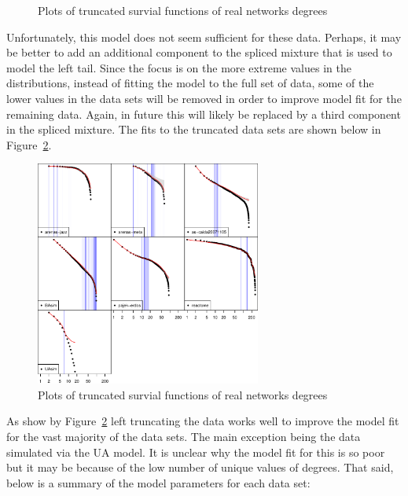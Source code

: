 \documentclass[
  10pt,
  a4paper,
]{scrreprt}
\theoremstyle{plain}
\theoremstyle{plain}
\theoremstyle{definition}
\theoremstyle{plain}
\theoremstyle{remark}
\begin{document}
{\begin{figure}[H]
{}

\caption{\label{fig-fits1}Plots of truncated survial functions of real
networks degrees}

\end{figure}

Unfortunately, this model does not seem sufficient for these data.
Perhaps, it may be better to add an additional component to the spliced
mixture that is used to model the left tail. Since the focus is on the
more extreme values in the distributions, instead of fitting the model
to the full set of data, some of the lower values in the data sets will
be removed in order to improve model fit for the remaining data. Again,
in future this will likely be replaced by a third component in the
spliced mixture. The fits to the truncated data sets are shown below in
Figure~\ref{fig-fits2}.

\begin{figure}[H]

{\centering \includegraphics[width=0.66\textwidth,height=\textheight]{doc_files/figure-pdf/fig-fits2-1.pdf}

}

\caption{\label{fig-fits2}Plots of truncated survial functions of real
networks degrees}

\end{figure}

As show by Figure~\ref{fig-fits2} left truncating the data works well to
improve the model fit for the vast majority of the data sets. The main
exception being the data simulated via the UA model. It is unclear why
the model fit for this is so poor but it may be because of the low
number of unique values of degrees. That said, below is a summary of the
model parameters for each data set:

}
\end{document}
